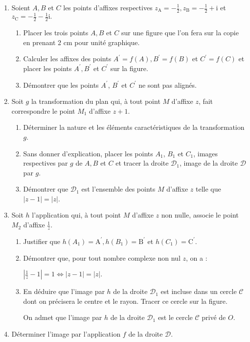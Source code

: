 \begin{enumerate}
     \item
     Soient $A, B$ et $C$ les points d'affixes respectives
     $z_{\text{A}}=-\frac{1}{2},   z_{\text{B}}=-\frac{1}{2}+\text{i} $ et $   z_{\text{C}}=-\frac{1}{2}-\frac{1}{2} \text{i}.$
     \begin{enumerate}[label=\alph*.]
          \item
          Placer les trois points $A, B$ et $C$ sur une figure que l'on fera sur la copie en prenant 2 cm pour unité graphique.
          \item
          Calculer les affixes des points $A^{\prime} = f\left(A\right),  B^{\prime} = f\left(B\right)$ et $C^{\prime} = f\left(C\right)$ et placer les points $A^{\prime}, B^{\prime}$ et $C^{\prime}$ sur la figure.
          \item
          Démontrer que les points $A^{\prime}$, $B^{\prime}$ et $C^{\prime}$ ne sont pas alignés.
     \end{enumerate}
     \item
     Soit $g$ la transformation du plan qui, à tout point $M$ d'affixe $z$, fait correspondre le point $M_{1}$ d'affixe $z + 1$.
     \begin{enumerate}[label=\alph*.]
          \item
          Déterminer la nature et les éléments caractéristiques de la transformation $g$.
          \item
          Sans donner d'explication, placer les points $A_{1}$, $B_{1}$ et $C_{1}$, images respectives par $g$ de $A, B$ et $C$ et tracer la droite $\mathscr D_{1}$, image de la droite $\mathscr D$ par $g$.
          \item
          Démontrer que $\mathscr D_{1}$ est l'ensemble des points $M$ d'affixe $z$ telle que $|z-1| = |z|$.
     \end{enumerate}
     \item
     Soit $h$ l'application qui, à tout point $M$ d'affixe $z$ non nulle, associe le point $M_{2}$ d'affixe $\frac{1}{z}$.
     \begin{enumerate}[label=\alph*.]
          \item
          Justifier que $h\left(A_{1}\right) = \text{A}^{\prime}, h\left(B_{1}\right) = \text{B}^{\prime}$ et $h \left(C_{1}\right) = \text{C}^{\prime}$.
          \item
          Démontrer que, pour tout nombre complexe non nul $z$, on a :
          \par
          $  \left| \frac{1}{z}-1\right|= 1 \Leftrightarrow   |z-1| = |z|.$
          \item
          En déduire que l'image par $h$ de la droite $\mathscr D_{1}$ est incluse dans un cercle $\mathscr C$ dont on précisera le centre et le rayon. Tracer ce cercle sur la figure.
          \par
          On admet que l'image par $h$ de la droite $\mathscr D_{1}$ est le cercle $\mathscr C$ privé de $O$.
     \end{enumerate}
     \item
     Déterminer l'image par l'application $f$ de la droite $\mathscr D$.
\end{enumerate}
